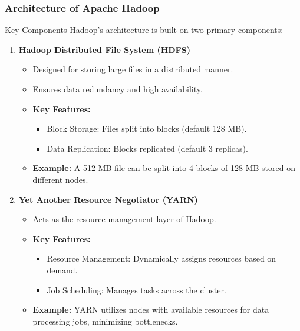 \documentclass{beamer}
\begin{document}
\begin{frame}[fragile]
    \frametitle{Architecture of Apache Hadoop}
    \begin{block}{Key Components}
        Hadoop's architecture is built on two primary components:
        \begin{enumerate}
            \item \textbf{Hadoop Distributed File System (HDFS)}
            \begin{itemize}
                \item Designed for storing large files in a distributed manner.
                \item Ensures data redundancy and high availability.
                \item \textbf{Key Features:}
                \begin{itemize}
                    \item Block Storage: Files split into blocks (default 128 MB).
                    \item Data Replication: Blocks replicated (default 3 replicas).
                \end{itemize}
                \item \textbf{Example:} A 512 MB file can be split into 4 blocks of 128 MB stored on different nodes.
            \end{itemize}
        
            \item \textbf{Yet Another Resource Negotiator (YARN)}
            \begin{itemize}
                \item Acts as the resource management layer of Hadoop.
                \item \textbf{Key Features:}
                \begin{itemize}
                    \item Resource Management: Dynamically assigns resources based on demand.
                    \item Job Scheduling: Manages tasks across the cluster.
                \end{itemize}
                \item \textbf{Example:} YARN utilizes nodes with available resources for data processing jobs, minimizing bottlenecks.
            \end{itemize}
        \end{enumerate}
    \end{block}
\end{frame}
\end{document}
